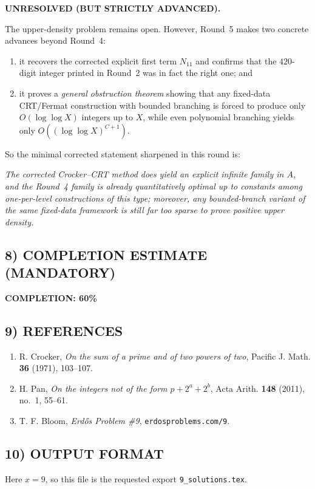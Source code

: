 \textbf{UNRESOLVED (BUT STRICTLY ADVANCED).}

\medskip
The upper-density problem remains open. However, Round~5 makes two concrete advances beyond Round~4:

\begin{enumerate}
\item it recovers the corrected explicit first term $N_{11}$ and confirms that the $420$-digit integer printed in Round~2 was in fact the right one; and
\item it proves a \emph{general obstruction theorem} showing that any fixed-data CRT/Fermat construction with bounded branching is forced to produce only $O(\log\log X)$ integers up to $X$, while even polynomial branching yields only $O((\log\log X)^{C+1})$.
\end{enumerate}

So the minimal corrected statement sharpened in this round is:

\medskip
\noindent\emph{The corrected Crocker--CRT method does yield an explicit infinite family in $A$, and the Round~4 family is already quantitatively optimal up to constants among one-per-level constructions of this type; moreover, any bounded-branch variant of the same fixed-data framework is still far too sparse to prove positive upper density.}

\subsection*{8) COMPLETION ESTIMATE (MANDATORY)}

\noindent\textbf{COMPLETION: 60\%}

\subsection*{9) REFERENCES}

\begin{enumerate}
\item R. Crocker, \emph{On the sum of a prime and of two powers of two}, Pacific J. Math. \textbf{36} (1971), 103--107.
\item H. Pan, \emph{On the integers not of the form $p+2^a+2^b$}, Acta Arith. \textbf{148} (2011), no.~1, 55--61.
\item T. F. Bloom, \emph{Erd\H{o}s Problem \#9}, \texttt{erdosproblems.com/9}.
\end{enumerate}

\subsection*{10) OUTPUT FORMAT}

Here $x=9$, so this file is the requested export \texttt{9\_solutions.tex}.
